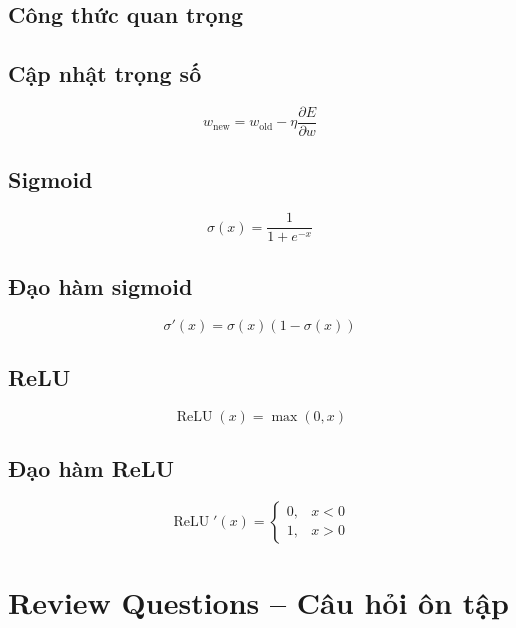 \subsection{Công thức quan trọng}

\subsection*{Cập nhật trọng số}

\[
    w_{\text{new}}
    =
    w_{\text{old}}
    -
    \eta
    \frac{\partial E}{\partial w}
\]

\subsection*{Sigmoid}

\[
    \sigma(x)=\frac{1}{1+e^{-x}}
\]

\subsection*{Đạo hàm sigmoid}

\[
    \sigma'(x)=\sigma(x)(1-\sigma(x))
\]

\subsection*{ReLU}

\[
    \operatorname{ReLU}(x)=\max(0,x)
\]

\subsection*{Đạo hàm ReLU}

\[
    \operatorname{ReLU}'(x)=
    \begin{cases}
    0, & x<0\\
    1, & x>0
    \end{cases}
\]

\section{Review Questions -- Câu hỏi ôn tập}

